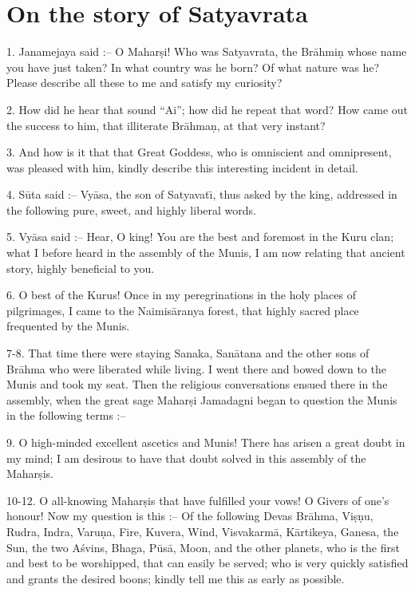 \chapter{On the story of Satyavrata}

1. Janamejaya said :-- O Mahar\d{s}i! Who was Satyavrata, the Br\=ahmi\d{n} whose name you have just taken? In what country was he born? Of what nature was he? Please describe all these to me and satisfy my curiosity?

2. How did he hear that sound ``Ai''; how did he repeat that word? How came out the success to him, that illiterate Br\=ahma\d{n}, at that very instant?

3. And how is it that that Great Goddess, who is omniscient and omnipresent, was pleased with him, kindly describe this interesting incident in detail.

4. S\=uta said :-- Vy\=asa, the son of Satyavat\={\i}, thus asked by the king, addressed in the following pure, sweet, and highly liberal words.

5. Vy\=asa said :-- Hear, O king! You are the best and foremost in the Kuru clan; what I before heard in the assembly of the Munis, I am now relating that ancient story, highly beneficial to you.

6. O best of the Kurus! Once in my peregrinations in the holy places of pilgrimages, I came to the Naimis\=aranya forest, that highly sacred place frequented by the Munis.

7-8. That time there were staying Sanaka, San\=atana and the other sons of Br\=ahma who were liberated while living. I went there and bowed down to the Munis and took my seat. Then the religious conversations ensued there in the assembly, when the great sage Mahar\d{s}i Jamadagni began to question the Munis in the following terms :--

9. O high-minded excellent ascetics and Munis! There has arisen a great doubt in my mind; I am desirous to have that doubt solved in this assembly of the Mahar\d{s}is.

10-12. O all-knowing Mahar\d{s}is that have fulfilled your vows! O Givers of one's honour! Now my question is this :-- Of the following Devas Br\=ahma, Vi\d{s}\d{n}u, Rudra, Indra, Varu\d{n}a, Fire, Kuvera, Wind, Visvakarm\=a, K\=artikeya, Ganesa, the Sun, the two A\'svins, Bhaga, P\=us\=a, Moon, and the other planets, who is the first and best to be worshipped, that can easily be served; who is very quickly satisfied and grants the desired boons; kindly tell me this as early as possible.

